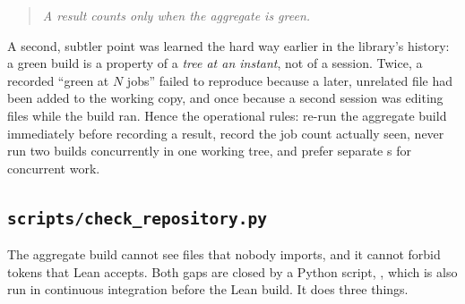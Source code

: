 \begin{quote}
\emph{A result counts only when the aggregate  is green.}
\end{quote}

A second, subtler point was learned the hard way earlier in the library's history: a green build is a property of a \emph{tree at an instant}, not of a session.
Twice, a recorded ``green at $N$ jobs'' failed to reproduce because a later, unrelated file had been
added to the working copy, and once because a second session was editing files while the build ran.
Hence the operational rules: re-run the aggregate build immediately before recording a result,
record the job count actually seen, never run two builds concurrently in one working tree, and
prefer separate s for concurrent work.

\subsection{\texorpdfstring{\texttt{scripts/check\_repository.py}}{The repository check}}\label{ch15:sec:checkrepo}

The aggregate build cannot see files that nobody imports, and it cannot forbid tokens that Lean
accepts. Both gaps are closed by a Python script, , which is also
run in continuous integration before the Lean build. It does three things.

